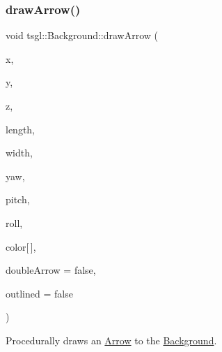 \subsubsection{\texorpdfstring{draw\+Arrow()}{drawArrow()}\hspace{0.1cm}{\footnotesize\ttfamily [2/2]}}
{\footnotesize\ttfamily void tsgl\+::\+Background\+::draw\+Arrow (\begin{DoxyParamCaption}\item[{float}]{x,  }\item[{float}]{y,  }\item[{float}]{z,  }\item[{float}]{length,  }\item[{float}]{width,  }\item[{float}]{yaw,  }\item[{float}]{pitch,  }\item[{float}]{roll,  }\item[{\hyperlink{structtsgl_1_1_color_float}{Color\+Float}}]{color\mbox{[}$\,$\mbox{]},  }\item[{bool}]{double\+Arrow = {\ttfamily false},  }\item[{bool}]{outlined = {\ttfamily false} }\end{DoxyParamCaption})\hspace{0.3cm}{\ttfamily [virtual]}}



Procedurally draws an \hyperlink{classtsgl_1_1_arrow}{Arrow} to the \hyperlink{classtsgl_1_1_background}{Background}. 

